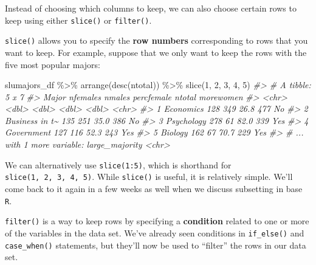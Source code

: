 \documentclass[
]{book}
\newenvironment{Shaded}{\begin{snugshade}}{\end{snugshade}}
\newcommand{\CommentTok}[1]{\textcolor[rgb]{0.56,0.35,0.01}{\textit{#1}}}
\newcommand{\DecValTok}[1]{\textcolor[rgb]{0.00,0.00,0.81}{#1}}
\newcommand{\FunctionTok}[1]{\textcolor[rgb]{0.00,0.00,0.00}{#1}}
\newcommand{\NormalTok}[1]{#1}
\newcommand{\SpecialCharTok}[1]{\textcolor[rgb]{0.00,0.00,0.00}{#1}}
\begin{document}
Instead of choosing which columns to keep, we can also choose certain rows to keep using either \texttt{slice()} or \texttt{filter()}.

\texttt{slice()} allows you to specify the \textbf{row numbers} corresponding to rows that you want to keep. For example, suppose that we only want to keep the rows with the five most popular majors:

\begin{Shaded}
\begin{Highlighting}[]
\NormalTok{slumajors\_df }\SpecialCharTok{\%\textgreater{}\%} \FunctionTok{arrange}\NormalTok{(}\FunctionTok{desc}\NormalTok{(ntotal)) }\SpecialCharTok{\%\textgreater{}\%}
  \FunctionTok{slice}\NormalTok{(}\DecValTok{1}\NormalTok{, }\DecValTok{2}\NormalTok{, }\DecValTok{3}\NormalTok{, }\DecValTok{4}\NormalTok{, }\DecValTok{5}\NormalTok{)}
\CommentTok{\#\textgreater{} \# A tibble: 5 x 7}
\CommentTok{\#\textgreater{}   Major          nfemales nmales percfemale ntotal morewomen}
\CommentTok{\#\textgreater{}   \textless{}chr\textgreater{}             \textless{}dbl\textgreater{}  \textless{}dbl\textgreater{}      \textless{}dbl\textgreater{}  \textless{}dbl\textgreater{} \textless{}chr\textgreater{}    }
\CommentTok{\#\textgreater{} 1 Economics           128    349       26.8    477 No       }
\CommentTok{\#\textgreater{} 2 Business in t\textasciitilde{}      135    251       35.0    386 No       }
\CommentTok{\#\textgreater{} 3 Psychology          278     61       82.0    339 Yes      }
\CommentTok{\#\textgreater{} 4 Government          127    116       52.3    243 Yes      }
\CommentTok{\#\textgreater{} 5 Biology             162     67       70.7    229 Yes      }
\CommentTok{\#\textgreater{} \# ... with 1 more variable: large\_majority \textless{}chr\textgreater{}}
\end{Highlighting}
\end{Shaded}

We can alternatively use \texttt{slice(1:5)}, which is shorthand for \texttt{slice(1,\ 2,\ 3,\ 4,\ 5)}. While \texttt{slice()} is useful, it is relatively simple. We'll come back to it again in a few weeks as well when we discuss subsetting in base \texttt{R}.

\texttt{filter()} is a way to keep rows by specifying a \textbf{condition} related to one or more of the variables in the data set. We've already seen conditions in \texttt{if\_else()} and \texttt{case\_when()} statements, but they'll now be used to ``filter'' the rows in our data set.
\end{document}
